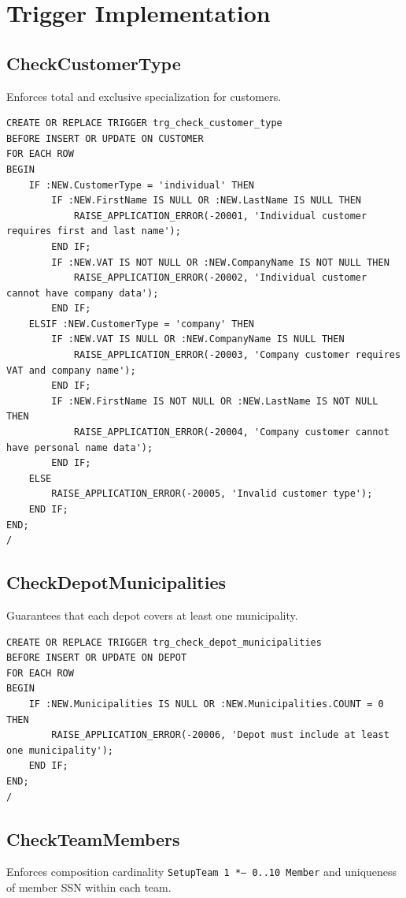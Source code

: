 \section{Trigger Implementation}


\subsection*{CheckCustomerType}
Enforces total and exclusive specialization for customers.

\begin{lstlisting}
CREATE OR REPLACE TRIGGER trg_check_customer_type
BEFORE INSERT OR UPDATE ON CUSTOMER
FOR EACH ROW
BEGIN
    IF :NEW.CustomerType = 'individual' THEN
        IF :NEW.FirstName IS NULL OR :NEW.LastName IS NULL THEN
            RAISE_APPLICATION_ERROR(-20001, 'Individual customer requires first and last name');
        END IF;
        IF :NEW.VAT IS NOT NULL OR :NEW.CompanyName IS NOT NULL THEN
            RAISE_APPLICATION_ERROR(-20002, 'Individual customer cannot have company data');
        END IF;
    ELSIF :NEW.CustomerType = 'company' THEN
        IF :NEW.VAT IS NULL OR :NEW.CompanyName IS NULL THEN
            RAISE_APPLICATION_ERROR(-20003, 'Company customer requires VAT and company name');
        END IF;
        IF :NEW.FirstName IS NOT NULL OR :NEW.LastName IS NOT NULL THEN
            RAISE_APPLICATION_ERROR(-20004, 'Company customer cannot have personal name data');
        END IF;
    ELSE
        RAISE_APPLICATION_ERROR(-20005, 'Invalid customer type');
    END IF;
END;
/
\end{lstlisting}

\subsection*{CheckDepotMunicipalities}
Guarantees that each depot covers at least one municipality.

\begin{lstlisting}
CREATE OR REPLACE TRIGGER trg_check_depot_municipalities
BEFORE INSERT OR UPDATE ON DEPOT
FOR EACH ROW
BEGIN
    IF :NEW.Municipalities IS NULL OR :NEW.Municipalities.COUNT = 0 THEN
        RAISE_APPLICATION_ERROR(-20006, 'Depot must include at least one municipality');
    END IF;
END;
/
\end{lstlisting}

\subsection*{CheckTeamMembers}
Enforces composition cardinality \texttt{SetupTeam 1 *-- 0..10 Member} and uniqueness of member SSN within each team.

